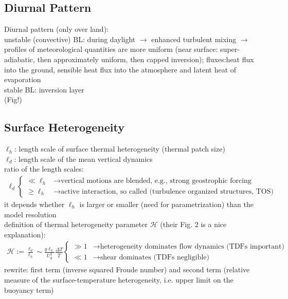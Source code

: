 \documentclass[11pt]{article}
\begin{document}
	\subsection{Diurnal Pattern}
	Diurnal pattern (only over land): \\
	unstable (convective) BL: during daylight $\rightarrow$ enhanced turbulent mixing $\rightarrow$ profiles of meteorological quantities are more uniform (near surface: super-adiabatic, then approximately uniform, then capped inversion); fluxes:heat flux into the ground, sensible heat flux into the atmosphere and latent heat of evaporation \\
	stable BL: inversion layer \\
	(Fig!)
	
	
	\subsection{Surface Heterogeneity}
	$\ell_h$: length scale of surface thermal heterogeneity (thermal patch size)\\
	$\ell_d$: length scale of the mean vertical dynamics \\
	
	ratio of the length scales:
	\begin{align}
		\ell_d \begin{cases}
			\ll \ell_h & \rightarrow \textrm{vertical motions are blended, e.g., strong geostrophic forcing} \\
			\ge \ell_h & \rightarrow \textrm{active interaction, so called (turbulence organized structures, TOS)}
		\end{cases}	
	\end{align}
 it depends whether $\ell_h$ is larger or smaller (need for parametrization) than the model resolution \\
 
 definition of thermal heterogeneity parameter $\mathcal{H}$ \citep{Margairaz2020a} (their Fig. 2 is a nice explanation):
 \begin{align}
 	\mathcal{H} := \frac{\ell_d}{\ell_h} \sim \frac{g \ell_h}{U_g^2} \frac{\Delta T}{\overline{T}}
 	\begin{cases}
 		\gg 1 & \rightarrow \textrm{heterogeneity dominates flow dynamics (TDFs important)} 	\\
 		\ll 1 & \rightarrow \textrm{shear dominates (TDFs negligible)}
 	\end{cases}
 \end{align}
rewrite: first term (inverse squared Froude number) and second term (relative measure of the surface-temperature heterogeneity, i.e. upper limit on the buoyancy term) \\
\end{document}
